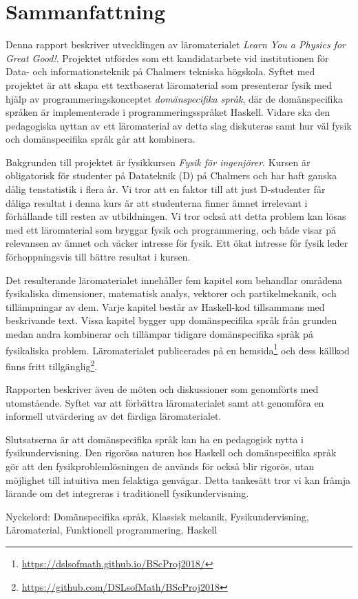 
\thispagestyle{plain}			%

\section*{Sammanfattning}

Denna rapport beskriver utvecklingen av läromaterialet \textit{Learn You a
Physics for Great Good!}. Projektet utfördes som ett kandidatarbete vid institutionen
för Data- och informationsteknik på Chalmers tekniska högskola. Syftet
med projektet är att skapa ett textbaserat läromaterial som presenterar fysik med hjälp av programmeringskonceptet
\textit{domänspecifika språk}, där de domänspecifika språken är
implementerade i programmeringsspråket Haskell. Vidare ska 
den pedagogiska nyttan av ett läromaterial av detta slag diskuteras samt hur väl fysik och
domänspecifika språk går att kombinera.

Bakgrunden till projektet är fysikkursen \textit{Fysik för ingenjörer}. Kursen är obligatorisk för studenter på Datateknik (D) på Chalmers och har haft ganska dålig tenstatistik i flera år. Vi tror att en
faktor till att just D-studenter får dåliga resultat i denna
kurs är att studenterna finner ämnet irrelevant i förhållande till
resten av utbildningen. Vi tror också att detta problem kan lösas med ett
läromaterial som bryggar fysik och
programmering, och både visar på relevansen av ämnet och väcker
intresse för fysik. Ett ökat intresse för fysik leder förhoppningsvis
till bättre resultat i kursen.

Det resulterande läromaterialet innehåller fem kapitel som
behandlar områdena fysikaliska dimensioner, matematisk analys,
vektorer och partikelmekanik, och tillämpningar av dem. Varje kapitel
består av Haskell-kod tillsammans med beskrivande
text. Vissa kapitel bygger upp domänspecifika språk från grunden medan
andra kombinerar och tillämpar tidigare domänspecifika språk på
fysikaliska problem. Läromaterialet publicerades på en hemsida\footnote{\url{https://dslsofmath.github.io/BScProj2018/}}
och dess källkod finns
fritt tillgänglig\footnote{\url{https://github.com/DSLsofMath/BScProj2018}}.

Rapporten beskriver
även de möten och diskussioner som genomförts med utomstående. Syftet var att
förbättra läromaterialet samt att genomföra en informell utvärdering av det
färdiga läromaterialet.

Slutsatserna är att
domänspecifika språk kan ha en pedagogisk nytta i
fysikundervisning. Den 
rigorösa naturen hos Haskell och domänspecifika språk gör att
den fysikproblemlösningen de används för också blir
rigorös, utan möjlighet till intuitiva men felaktiga
genvägar. Detta tankesätt tror vi kan främja lärande om det integreras i
traditionell fysikundervisning.

\vfill
Nyckelord: Domänspecifika språk, Klassisk mekanik, Fysikundervisning, Läromaterial, Funktionell programmering, Haskell

\newpage				%
\thispagestyle{empty}
\mbox{}
